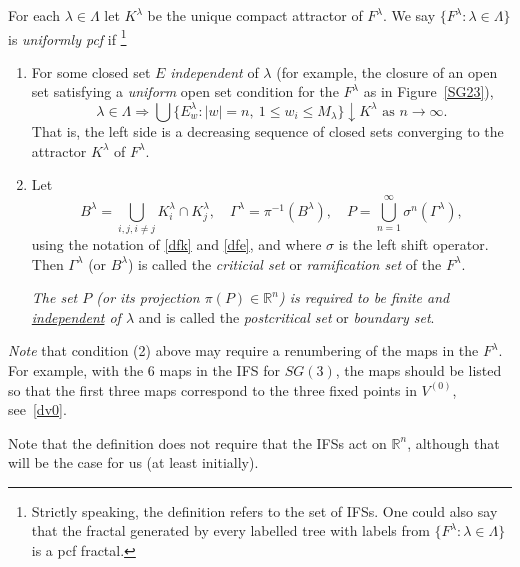 \documentclass[a4paper]{amsart}
\theoremstyle{plain}
\theoremstyle{definition}
\theoremstyle{remark}
\begin{document}
For each $ \lambda \in \Lambda $ let $ K^\lambda $ be the unique compact attractor of $ F^\lambda $. 
We say $ \{ F^\lambda : \lambda \in \Lambda \}  $ is \emph{uniformly pcf} if%
\footnote{Strictly speaking, the definition refers to the set of IFSs.   One could also say that the fractal generated by every labelled tree with labels from $ \{F^ \lambda : \lambda \in \Lambda\} $ is a pcf fractal.} 
\begin{enumerate}
 
\item For some closed set $ E $ \emph{independent} of $ \lambda $ (for example, the closure of an open set satisfying a \emph{uniform} open set condition for the $  F^\lambda $ as in Figure~\ref{SG23}), 
\begin{equation} \label{}       
\lambda \in \Lambda \Longrightarrow  \bigcup \{E^ \lambda _w :   |w|=n,\ 1\leq w_i\leq M_\lambda      \}  \downarrow K^ \lambda \text{ as } n \to \infty.
\end{equation} 
That is, the left side is a decreasing sequence of closed sets converging to the attractor $ K^ \lambda $ of $ F^\lambda  $.   

\item Let 
\begin{equation} \label{} 
B^ \lambda  = \bigcup_{i,j, i\neq j} K_i^ \lambda \cap K_j ^ \lambda  , \quad 
\Gamma^ \lambda  = \pi^{-1} (B^ \lambda ), \quad 
P   = \bigcup_{n=1}^\infty \sigma^n (\Gamma^ \lambda ),
\end{equation} 
using the notation of \eqref{dfk} and \eqref{dfe}, and where $ \sigma $ is the left shift operator.  
Then  $\Gamma^ \lambda $ (or $ B^ \lambda $) is called the \emph{criticial set} or \emph{ramification set} of the $F^ \lambda   $. 

 \emph{The set $  P  $ (or its projection $ \pi (P)\in \mathbb{R}^n   $) is required to be finite and \underline{independent} of $ \lambda $} and is called the \emph{postcritical set} or \emph{boundary set}.
 \end{enumerate} 
 
 \emph{Note} that condition (2) above may require a renumbering of the maps in the $ F^\lambda  $.  For example, with   the 6 maps in the IFS for $ SG(3) $, the maps should be listed so that the first three maps correspond to the three fixed points in $ V^{(0)} $, see~\eqref{dv0}.


Note that the definition does not require that the IFSs act on $  \mathbb{R}^n $, although that will be the case for us (at least initially). 
\end{document}
